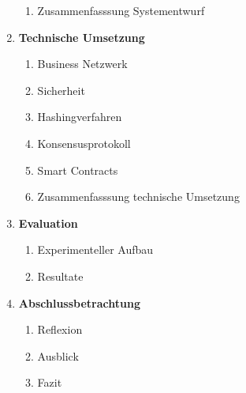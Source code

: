 \begin{small}
\begin{enumerate}
\begin{enumerate}[label*=\arabic*.]
      \item Zusammenfasssung Systementwurf
    \end{enumerate}
    \item \textbf{Technische Umsetzung}
    \begin{enumerate}[label*=\arabic*.]
      \item Business Netzwerk
      \item Sicherheit
      \item Hashingverfahren
      \item Konsensusprotokoll
      \item Smart Contracts
      \item Zusammenfasssung technische Umsetzung
    \end{enumerate}
    \item \textbf{Evaluation}
    \begin{enumerate}[label*=\arabic*.]
      \item Experimenteller Aufbau
      \item Resultate
    \end{enumerate}
    \item \textbf{Abschlussbetrachtung}
    \begin{enumerate}[label*=\arabic*.]
      \item Reflexion
      \item Ausblick
      \item Fazit
    \end{enumerate}
  \end{enumerate}
\end{small}

